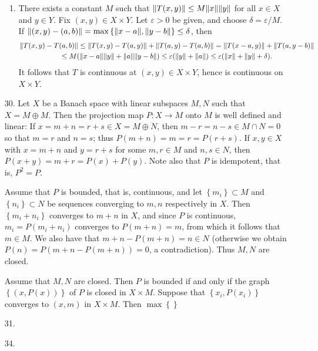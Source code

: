 \documentclass[11pt,leqno]{article}
\theoremstyle{plain}
\theoremstyle{definition}
\numberwithin{equation}{section}
\numberwithin{lem}{section}
\newcommand{\cbr}[1]{\left\{#1\right\}}
\begin{document}
\begin{enumerate}
\begin{enumerate}
    \item There exists a constant $M$ such that $\norm{T(x,y)}\leq M\norm{x}\norm{y}$ for all $x\in X$ and $y\in Y$. Fix $(x,y)\in X\times Y$. Let $\varepsilon>0$ be given, and choose $\delta = \varepsilon/M$. If $\norm{(x,y) - (a,b)} = \max\cbr{\norm{x-a},\norm{y-b}}\leq\delta$, then \begin{multline*}
      \norm{T(x,y) - T(a,b)} \leq \norm{T(x,y) - T(a,y)} + \norm{T(a,y) - T(a,b)} = \norm{T(x-a,y)} + \norm{T(a,y-b)}\\ \leq M(\norm{x-a}\norm{y} + \norm{a}\norm{y-b})\leq \varepsilon(\norm{y} + \norm{a})\leq \varepsilon(\norm{x} + \norm{y} + \delta).
    \end{multline*}
    It follows that $T$ is continuous at $(x,y)\in X\times Y$, hence is continuous on $X\times Y$.
  \end{enumerate}
  
  \item[30.] Let $X$ be a Banach space with linear subspaces $M,N$ such that $X = M\oplus M$. Then the projection map $P\colon X \to M$ onto $M$ is well defined and linear: If $x= m+n= r+s\in X = M\oplus N$, then $m-r = n-s \in M\cap N = 0$ so that $m = r$ and $n = s$; thus $P(m+n) = m = r = P(r+s)$. If $x,y\in X$ with $x = m+n$ and $y = r+s$ for some $m,r\in M$ and $n,s\in N$, then $P(x+y)= m+r = P(x) + P(y)$. Note also that $P$ is idempotent, that is, $P^2 = P$.

  Assume that $P$ is bounded, that is, continuous, and let $\cbr{m_i}\subset M$ and $\cbr{n_i}\subset N$ be sequences converging to $m,n$ respectively in $X$. Then $\cbr{m_i + n_i}$ converges to $m+n$ in $X$, and since $P$ is continuous, $m_i = P(m_i+n_i)$ converges to $P(m+n) = m$, from which it follows that $m\in M$. We also have that $m+n-P(m+n) = n\in N$ (otherwise we obtain $P(n) = P(m+n-P(m+n)) = 0$, a contradiction). Thus $M,N$ are closed.

  Assume that $M,N$ are closed. Then $P$ is bounded if and only if the graph $\cbr{(x,P(x))}$ of $P$ is closed in $X\times M$. Suppose that $\cbr{x_i,P(x_i)}$ converges to $(x,m)$ in $X\times M$. Then $\max\cbr{}$
  
  \item[31.] 
  
  \item[34.] 
\end{enumerate}
\end{document}
